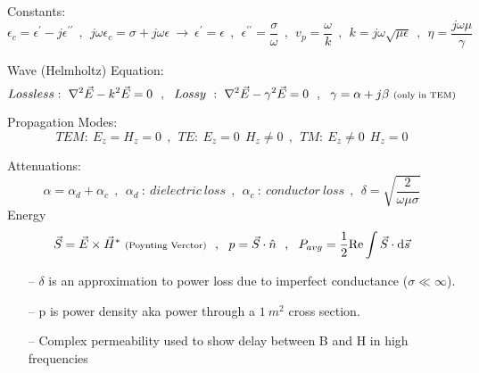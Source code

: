 Constants:
$$ {\epsilon}_c = {\epsilon}^{\prime} - j {\epsilon}^{\prime\prime}  ~~ , ~~ j \omega {\epsilon}_c = \sigma + j \omega \epsilon ~ \rightarrow ~  {\epsilon}^\prime = {\epsilon} ~~ , ~~ {\epsilon}^{\prime\prime} = \frac{\sigma}{\omega}  ~~ , ~~ v_p = \frac{\omega}{k} ~~ , ~~ k = j \omega \sqrt{\mu \epsilon} ~~ , ~~  \eta = \frac{j \omega \mu}{\gamma} $$
\par
Wave (Helmholtz) Equation:
$$Lossless:~ \nabla^2 \vec{E} - k^2 \vec{E} = 0 ~~ , ~~ Lossy ~ : ~ \nabla^2 \vec{E} - {\gamma}^2 \vec{E} = 0 ~~ , ~~ \gamma = \alpha + j\beta~ \text{\scriptsize(only~in~TEM)}  $$
\par
Propagation Modes: 
$$TEM:~ E_z = H_z = 0 ~~ , ~~ TE:~ E_z = 0 ~~ H_z \neq 0 ~~ , ~~ TM:~ E_z \neq 0 ~~ H_z = 0 $$
\par
Attenuations: 
$$ \alpha = {\alpha}_d + {\alpha}_c ~~ , ~~ {\alpha}_d ~: ~ dielectric~loss ~~ , ~~ {\alpha}_c ~ : ~ conductor~loss  ~~ , ~~ \delta = \sqrt{\frac{2}{\omega \mu \sigma}} $$
Energy
$$ \vec{S} = \vec{E} \times  \vec{H}^*~\text{\scriptsize(Poynting~Verctor)} ~~ , ~~ p = \vec{S} \cdot \hat{n} ~~ , ~~ P_{avg} = \frac{1}{2} \text{Re} \int{ \vec{S} \cdot \mathrm{d}\vec{s}}$$
\setlength{\parindent}{0.5cm} %
\vspace{-10pt}\par
\setlength{\parindent}{0.0cm}
\par\noindent
\begin{itemize}
\item[--] $\delta$ is an approximation to power loss due to imperfect conductance ($\sigma\ll\infty$).
\item[--] p is power density aka power through a $1~m^2$ cross section.
\item[--] Complex permeability used to show delay between B and H in high frequencies
\end{itemize}
\par
\setlength{\parindent}{0.0cm} %
